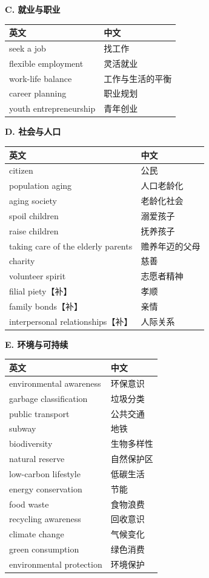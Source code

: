 \documentclass[11pt,a4paper]{ctexart}
\begin{document}
\par\addvspace{5pt}\noindent\textbf{C. 就业与职业}\par\addvspace{2pt}
\begin{longtable}{L{5.8cm}L{10.2cm}}
\toprule
\textbf{英文} & \textbf{中文} \\
\midrule
\endhead
seek a job & 找工作 \\
flexible employment & 灵活就业 \\
work-life balance & 工作与生活的平衡 \\
career planning & 职业规划 \\
youth entrepreneurship & 青年创业 \\
\bottomrule
\end{longtable}

\par\addvspace{5pt}\noindent\textbf{D. 社会与人口}\par\addvspace{2pt}
\begin{longtable}{L{5.8cm}L{10.2cm}}
\toprule
\textbf{英文} & \textbf{中文} \\
\midrule
\endhead
citizen & 公民 \\
population aging & 人口老龄化 \\
aging society & 老龄化社会 \\
spoil children & 溺爱孩子 \\
raise children & 抚养孩子 \\
taking care of the elderly parents & 赡养年迈的父母 \\
charity & 慈善 \\
volunteer spirit & 志愿者精神 \\
filial piety【补】 & 孝顺 \\
family bonds【补】 & 亲情 \\
interpersonal relationships【补】 & 人际关系 \\
\bottomrule
\end{longtable}

\par\addvspace{5pt}\noindent\textbf{E. 环境与可持续}\par\addvspace{2pt}
\begin{longtable}{L{5.8cm}L{10.2cm}}
\toprule
\textbf{英文} & \textbf{中文} \\
\midrule
\endhead
environmental awareness & 环保意识 \\
garbage classification & 垃圾分类 \\
public transport & 公共交通 \\
subway & 地铁 \\
biodiversity & 生物多样性 \\
natural reserve & 自然保护区 \\
low-carbon lifestyle & 低碳生活 \\
energy conservation & 节能 \\
food waste & 食物浪费 \\
recycling awareness & 回收意识 \\
climate change & 气候变化 \\
green consumption & 绿色消费 \\
environmental protection & 环境保护 \\
\bottomrule
\end{longtable}
\end{document}
